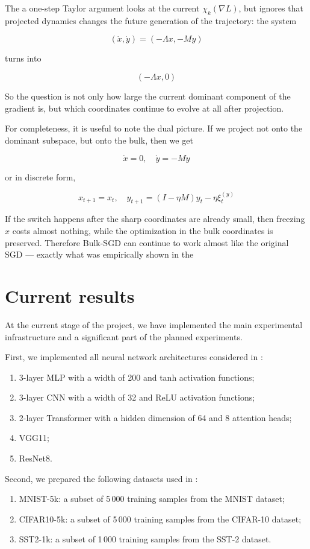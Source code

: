 \documentclass[conference]{IEEEtran}
\begin{document}
The a one-step Taylor argument looks at the current $\chi_k(\nabla L)$, but ignores that projected dynamics changes the future generation of the trajectory: the system

\[
(\dot x, \dot y) = (-\Lambda x, -My)
\]

turns into

\[
(-\Lambda x, 0)
\]

So the question is not only how large the current dominant component of the gradient is, but which coordinates continue to evolve at all after projection.

For completeness, it is useful to note the dual picture. If we project not onto the dominant subspace, but onto the bulk, then we get

\[
\dot x = 0, \quad \dot y = -My
\]

or in discrete form,

\[
x_{t+1} = x_t, \quad y_{t+1} = (I-\eta M)y_t-\eta \xi_t^{(y)}
\]

If the switch happens after the sharp coordinates are already small, then freezing $x$ costs almost nothing, while the optimization in the bulk coordinates is preserved. Therefore Bulk-SGD can continue to work almost like the original SGD — exactly what was empirically shown in the \citet{SongDoesSGD}

\section{Current results}

At the current stage of the project, we have implemented the main experimental infrastructure and a significant part of the planned experiments.

First, we implemented all neural network architectures considered in \citet{SongDoesSGD}:
\begin{enumerate}
    \item 3-layer MLP with a width of 200 and tanh activation functions;
    \item 3-layer CNN with a width of 32 and ReLU activation functions;
    \item 2-layer Transformer with a hidden dimension of 64 and 8 attention
heads;
    \item VGG11;
    \item ResNet8.
\end{enumerate}
Second, we prepared the following datasets used in \citet{SongDoesSGD}:
\begin{enumerate}
    \item MNIST-5k: a subset of 5\,000 training samples from the MNIST dataset;
    \item CIFAR10-5k: a subset of 5\,000 training samples from the CIFAR-10 dataset;
    \item SST2-1k: a subset of 1\,000 training samples from the SST-2 dataset.
\end{enumerate}
\end{document}
